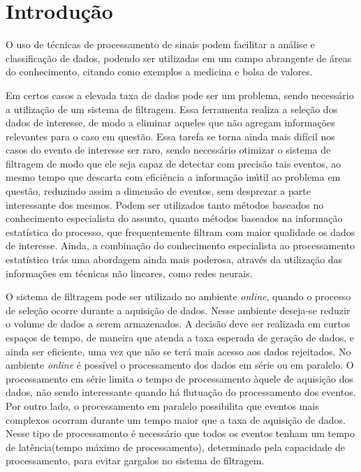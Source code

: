 \chapter{Introdução}

O uso de técnicas de processamento de sinais podem facilitar a análise e
classificação de dados, podendo ser utilizadas em um campo abrangente de áreas
do conhecimento, citando como exemplos a medicina e bolsa de valores.

Em certos casos a elevada taxa de dados pode ser um problema, sendo necessário a
utilização de um sistema de filtragem. Essa ferramenta realiza a seleção dos dados 
de interesse, de modo a eliminar aqueles que não agregam informações relevantes 
para o caso em questão. Essa tarefa se torna ainda mais difícil nos casos do evento 
de interesse ser raro, sendo necessário otimizar o sistema de filtragem de modo que 
ele seja capaz de detectar com precisão tais eventos, ao mesmo tempo que descarta 
com eficiência a informação inútil ao problema em questão, reduzindo assim a dimensão 
de eventos, sem desprezar a parte interessante dos mesmos.
Podem ser utilizados tanto métodos baseados no conhecimento especialista do
assunto, quanto métodos baseados na informação estatística do processo, 
que frequentemente filtram com maior qualidade os dados de interesse. Ainda, 
a combinação do conhecimento especialista ao processamento 
estatístico trás uma abordagem ainda mais poderosa, através da utilização das informações 
em técnicas não lineares, como redes neurais.

O sistema de filtragem pode ser utilizado no ambiente {\it online},
quando o processo de seleção ocorre durante a aquisição de dados. Nesse ambiente
deseja-se reduzir o volume de dados a serem armazenados. A decisão deve ser realizada 
em curtos espaços de tempo, de maneira que atenda a taxa esperada de geração de
dados, e ainda ser eficiente, uma vez que não se terá mais acesso aos dados
rejeitados. No ambiente {\it online} é possível o processamento dos dados em série
ou em paralelo. O processamento em série limita o tempo de processamento àquele
de aquisição dos dados, não sendo interessante quando há flutuação do
processamento dos eventos. Por outro lado, o processamento em
paralelo possibilita que eventos mais complexos ocorram durante um tempo maior
que a taxa de aquisição de dados. Nesse tipo de processamento é necessário que
todos os eventos tenham um tempo de latência(tempo máximo de processamento), determinado pela capacidade
de processamento, para evitar gargalos no sistema de filtragem.

